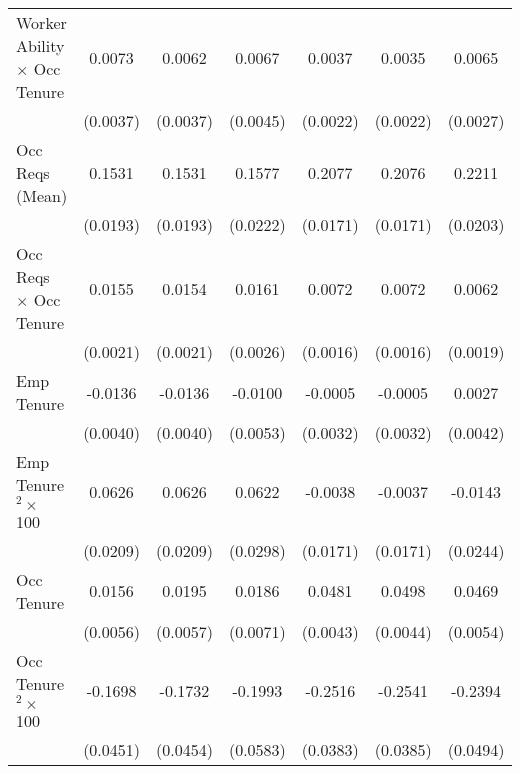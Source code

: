 {\begin{longtable}{l*{6}{c}}
Worker Ability $\times$ Occ Tenure&      0.0073\sym{**} &      0.0062\sym{*}  &      0.0067         &      0.0037\sym{*}  &      0.0035         &      0.0065\sym{**} \\
                    &    (0.0037)         &    (0.0037)         &    (0.0045)         &    (0.0022)         &    (0.0022)         &    (0.0027)         \\
Occ Reqs (Mean)     &      0.1531\sym{***}&      0.1531\sym{***}&      0.1577\sym{***}&      0.2077\sym{***}&      0.2076\sym{***}&      0.2211\sym{***}\\
                    &    (0.0193)         &    (0.0193)         &    (0.0222)         &    (0.0171)         &    (0.0171)         &    (0.0203)         \\
Occ Reqs $\times$ Occ Tenure&      0.0155\sym{***}&      0.0154\sym{***}&      0.0161\sym{***}&      0.0072\sym{***}&      0.0072\sym{***}&      0.0062\sym{***}\\
                    &    (0.0021)         &    (0.0021)         &    (0.0026)         &    (0.0016)         &    (0.0016)         &    (0.0019)         \\
Emp Tenure          &     -0.0136\sym{***}&     -0.0136\sym{***}&     -0.0100\sym{*}  &     -0.0005         &     -0.0005         &      0.0027         \\
                    &    (0.0040)         &    (0.0040)         &    (0.0053)         &    (0.0032)         &    (0.0032)         &    (0.0042)         \\
Emp Tenure$^2\times$ 100&      0.0626\sym{***}&      0.0626\sym{***}&      0.0622\sym{**} &     -0.0038         &     -0.0037         &     -0.0143         \\
                    &    (0.0209)         &    (0.0209)         &    (0.0298)         &    (0.0171)         &    (0.0171)         &    (0.0244)         \\
Occ Tenure          &      0.0156\sym{***}&      0.0195\sym{***}&      0.0186\sym{***}&      0.0481\sym{***}&      0.0498\sym{***}&      0.0469\sym{***}\\
                    &    (0.0056)         &    (0.0057)         &    (0.0071)         &    (0.0043)         &    (0.0044)         &    (0.0054)         \\
Occ Tenure$^2\times$ 100&     -0.1698\sym{***}&     -0.1732\sym{***}&     -0.1993\sym{***}&     -0.2516\sym{***}&     -0.2541\sym{***}&     -0.2394\sym{***}\\
                    &    (0.0451)         &    (0.0454)         &    (0.0583)         &    (0.0383)         &    (0.0385)         &    (0.0494)         \\

\end{longtable}}
